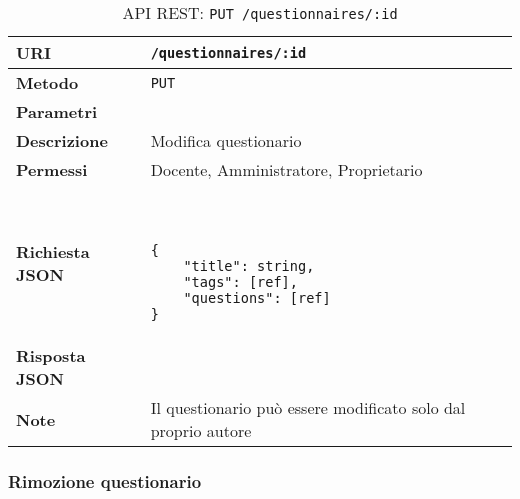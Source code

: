         \begin{table}[H]
            \begin{center}
                \begin{tabular}{p{} p{}}
                    \toprule
                    \textbf{URI} & \texttt{/questionnaires/:id} \\ \midrule
                    \textbf{Metodo} & \texttt{PUT} \\ \midrule
                    \textbf{Parametri} & \\ \midrule
                    \textbf{Descrizione} & Modifica questionario \\ \midrule
                    \textbf{Permessi} & Docente, Amministratore, Proprietario  \\ \midrule
                    \textbf{Richiesta JSON} & \
                        \begin{lstlisting}[basicstyle={\ttfamily}]
{
    "title": string,
    "tags": [ref],
    "questions": [ref] 
}
                        \end{lstlisting}
                        \\ \midrule
                    \textbf{Risposta JSON} & \\ \midrule
                    \textbf{Note} & Il questionario può essere modificato solo dal proprio autore \\
                    \bottomrule
                \end{tabular}
                \caption{API REST: \texttt{PUT /questionnaires/:id}}
            \end{center}
        \end{table}

    \subsubsection{Rimozione questionario}

